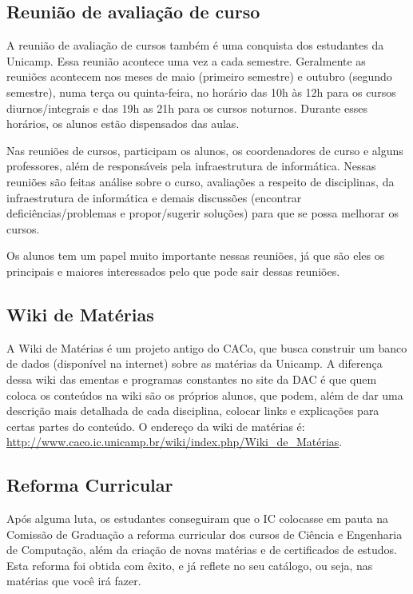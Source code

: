 \subsection{Reunião de avaliação de curso}

A reunião de avaliação de cursos também é uma conquista dos estudantes da
Unicamp. Essa reunião acontece uma vez a cada semestre. Geralmente as reuniões
acontecem nos meses de maio (primeiro semestre) e outubro (segundo semestre),
numa terça ou quinta-feira, no horário das 10h às 12h para os cursos
diurnos/integrais e das 19h as 21h para os cursos noturnos. Durante esses
horários, os alunos estão dispensados das aulas.

Nas reuniões de cursos, participam os alunos, os coordenadores de curso e alguns
professores, além de responsáveis pela infraestrutura de informática. Nessas
reuniões são feitas análise sobre o curso, avaliações a respeito de disciplinas,
da infraestrutura de informática e demais discussões (encontrar
deficiências/problemas e propor/sugerir soluções) para que se possa melhorar os
cursos.

Os alunos tem um papel muito importante nessas reuniões, já que são eles os
principais e maiores interessados pelo que pode sair dessas reuniões.

\subsection{Wiki de Matérias}

A Wiki de Matérias é um projeto antigo do CACo, que busca construir um banco de
dados (disponível na internet) sobre as matérias da Unicamp. A diferença dessa
wiki das ementas e programas constantes no site da DAC é que quem coloca os
conteúdos na wiki são os próprios alunos, que podem, além de dar uma descrição
mais detalhada de cada disciplina, colocar links e explicações para certas
partes do conteúdo. O endereço da wiki de matérias é:
\url{http://www.caco.ic.unicamp.br/wiki/index.php/Wiki_de_Matérias}.

\subsection{Reforma Curricular}

Após alguma luta, os estudantes conseguiram que o IC colocasse em pauta na
Comissão de Graduação a reforma curricular dos cursos de Ciência e Engenharia de
Computação, além da criação de novas matérias e de certificados de estudos. Esta
reforma foi obtida com êxito, e já reflete no seu catálogo, ou seja, nas
matérias que você irá fazer.

